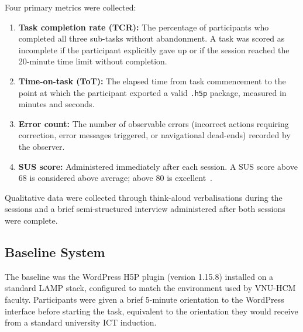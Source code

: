 Four primary metrics were collected:

\begin{enumerate}
  \item \textbf{Task completion rate (TCR):} The percentage of participants
  who completed all three sub-tasks without abandonment. A task was scored
  as incomplete if the participant explicitly gave up or if the session
  reached the 20-minute time limit without completion.

  \item \textbf{Time-on-task (ToT):} The elapsed time from task
  commencement to the point at which the participant exported a valid
  \texttt{.h5p} package, measured in minutes and seconds.

  \item \textbf{Error count:} The number of observable errors (incorrect
  actions requiring correction, error messages triggered, or navigational
  dead-ends) recorded by the observer.

  \item \textbf{SUS score:} Administered immediately after each session.
  A SUS score above 68 is considered above average; above 80 is
  excellent~\cite{brooke1996}.
\end{enumerate}

Qualitative data were collected through think-aloud verbalisations during
the sessions and a brief semi-structured interview administered after both
sessions were complete.

\subsection{Baseline System}

The baseline was the WordPress H5P plugin (version 1.15.8) installed on a
standard LAMP stack, configured to match the environment used by VNU-HCM
faculty. Participants were given a brief 5-minute orientation to the
WordPress interface before starting the task, equivalent to the orientation
they would receive from a standard university ICT induction.
